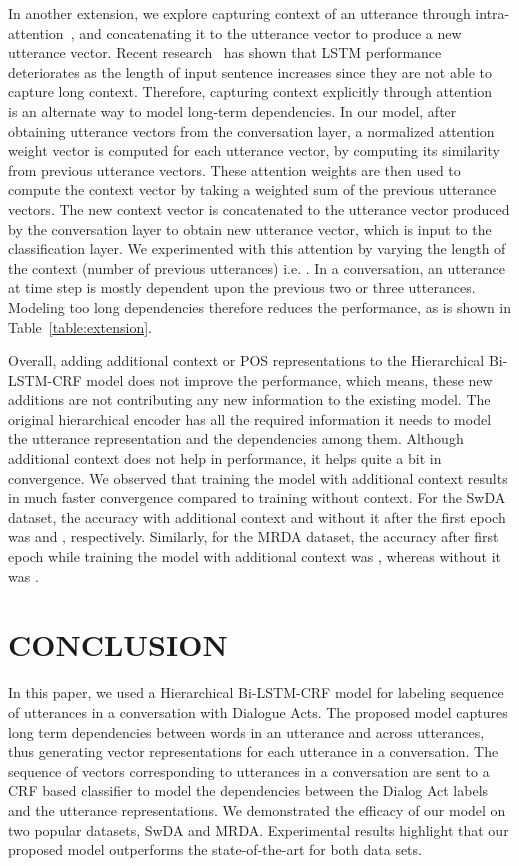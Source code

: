\documentclass[letterpaper]{article} \usepackage{aaai18}
\begin{document}
In another extension, we explore capturing context of an utterance through intra-attention~\cite{paulus2017deep}, and concatenating it to the utterance vector to produce a new utterance vector. Recent research~\cite{Cho2014} has shown that LSTM performance deteriorates as the length of input sentence increases since they are not able to capture long context. Therefore, capturing context explicitly through attention~\cite{Bahdanau2015} is an alternate way to model long-term dependencies. In our model, after obtaining utterance vectors from the conversation layer, a normalized attention weight vector is computed for each utterance vector, by computing its similarity from previous utterance vectors. These attention weights are then used to compute the context vector by taking a weighted sum of the previous  utterance vectors. The new context vector is concatenated to the utterance vector produced by the conversation layer to obtain new utterance vector, which is input to the classification layer. We experimented with this attention by varying the length of the context (number of previous utterances) i.e. .  In a conversation, an utterance at time step  is mostly dependent upon the previous two or three utterances. Modeling too long dependencies therefore reduces the performance, as is shown in Table~\ref{table:extension}. 

Overall, adding additional context or POS representations to the Hierarchical Bi-LSTM-CRF model does not improve the performance, which means, these new additions are not contributing any new information to the existing model. The original hierarchical encoder has all the required information it needs to model the utterance representation and the dependencies among them. Although additional context does not help in performance, it helps quite a bit in convergence. We observed that training the model with additional context results in much faster convergence compared to training without context. For the SwDA dataset, the accuracy with additional context and without it after the first epoch was  and , respectively. Similarly, for the MRDA dataset, the accuracy after first epoch while training the model with additional context was , whereas without it was .


\section{CONCLUSION}
\label{sec:conclusion}
In this paper, we used a Hierarchical Bi-LSTM-CRF model for labeling sequence of utterances in a conversation with Dialogue Acts. The proposed model captures long term dependencies between words in an utterance and across utterances, thus generating vector representations for each utterance in a conversation. The sequence of vectors corresponding to utterances in a conversation are sent to a CRF based classifier to model the dependencies between the Dialog Act labels and the utterance representations. We demonstrated the efficacy of our model on two popular datasets, SwDA and MRDA. Experimental results highlight that our proposed model outperforms the state-of-the-art for both data sets.
\fontsize{9.5pt}{10.5pt} \selectfont


\end{document}
